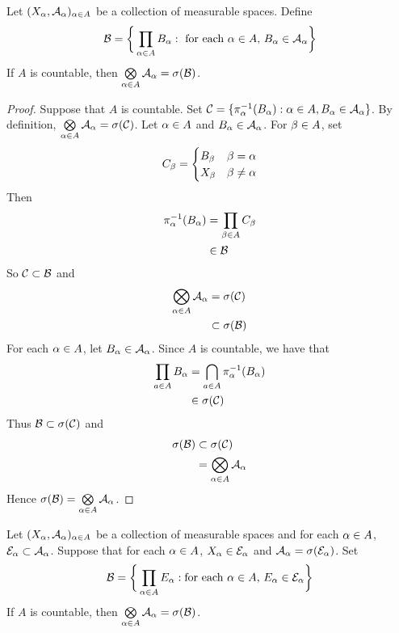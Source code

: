 \documentclass{book}
\begin{document}
 	\begin{ex} 
 		Let $(X_{\alpha}, \mathcal{A}_{\alpha})_{\alpha \in A}$ be a collection of measurable spaces. Define $$\mathcal{B} = \bigg \{\prod_{\alpha \in A}B_{\alpha}: \text{ for each $\alpha \in A$, } B_{\alpha} \in \mathcal{A}_{\alpha} \bigg\}$$
 		If $A$ is countable, then $\bigotimes\limits_{\alpha \in A} \mathcal{A}_{\alpha} = \sigma(\mathcal{B})$. 
 	\end{ex}
 	
 	\begin{proof}
 		Suppose that $A$ is countable. Set $\mathcal{C} = \{\pi_{\alpha}^{-1}(B_{\alpha}): \alpha \in A, B_{\alpha} \in \mathcal{A}_{\alpha}\}$. By definition, $\bigotimes\limits_{\alpha \in A} \mathcal{A}_{\alpha} = \sigma(\mathcal{C})$. Let $\alpha \in A$ and $B_{\alpha} \in \mathcal{A}_{\alpha}$. For $\beta \in A$, set 
 		\[
 		C_{\beta} = 
 		\begin{cases}
 			B_{\beta} & \beta = \alpha \\
 			X_{\beta} & \beta \neq \alpha
 		\end{cases}
 		\]
 		Then 
 		\begin{align*}
 			\pi_{\alpha}^{-1}(B_{\alpha}) 
 			& = \prod_{\beta \in A} C_{\beta} \\
 			& \in \mathcal{B}
 		\end{align*}
 		So $\mathcal{C} \subset \mathcal{B}$ and 
 		\begin{align*}
 			\bigotimes\limits_{\alpha \in A} \mathcal{A}_{\alpha}
 			& = \sigma(\mathcal{C}) \\
 			& \subset \sigma(\mathcal{B})
 		\end{align*}
 		For each $\alpha \in A$, let $B_{\alpha} \in \mathcal{A}_{\alpha}$. Since $A$ is countable, we have that 
 		\begin{align*}
 			\prod_{a \in A} B_{\alpha} 
 			& = \bigcap_{a \in A} \pi_{\alpha}^{-1}(B_{\alpha}) \\
 			& \in \sigma(\mathcal{C}) 
 		\end{align*}
 		Thus $\mathcal{B} \subset \sigma(\mathcal{C})$ and 
 		\begin{align*}
 			\sigma(\mathcal{B}) 
 			& \subset \sigma(\mathcal{C}) \\
 			& = \bigotimes\limits_{\alpha \in A} \mathcal{A}_{\alpha}
 		\end{align*}
 		Hence $\sigma(\mathcal{B}) = \bigotimes\limits_{\alpha \in A} \mathcal{A}_{\alpha}$. 
 	\end{proof}
 
 	\begin{ex} 
 		Let $(X_{\alpha}, \mathcal{A}_{\alpha})_{\alpha \in A}$ be a collection of measurable spaces and for each $\alpha \in A$, $\mathcal{E}_{\alpha} \subset \mathcal{A}_{\alpha}$. Suppose that for each $\alpha \in A$, $X_{\alpha} \in \mathcal{E}_{\alpha}$ and $\mathcal{A}_{\alpha} = \sigma(\mathcal{E}_{\alpha})$. Set 
 		$$\mathcal{B} = \bigg \{ \prod\limits_{\alpha \in A} E_{\alpha}:  \text{for each $\alpha \in A$, } E_{\alpha} \in \mathcal{E}_{\alpha} \bigg \}$$ 
 		If $A$ is countable, then $\bigotimes\limits_{\alpha \in A} \mathcal{A}_{\alpha} = \sigma(\mathcal{B})$.
 	\end{ex}
 
\end{document}
